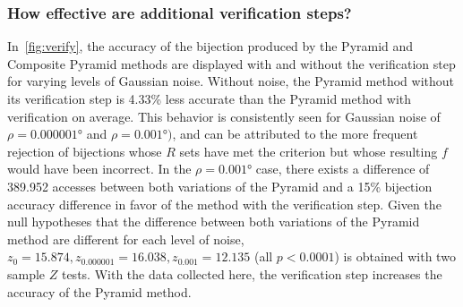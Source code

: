 \subsubsection{How effective are additional verification steps?}
%
%
%
%
%
%

In~\autoref{fig:verify}, the accuracy of the bijection produced by the Pyramid and Composite Pyramid methods are
displayed with and without the verification step for varying levels of Gaussian noise.
Without noise, the Pyramid method without its verification step is 4.33\% less accurate than the Pyramid method with
verification on average.
This behavior is consistently seen for Gaussian noise of $\rho=\ang{0.000001}$ and $\rho=\ang{0.001})$, and
can be attributed to the more frequent rejection of bijections whose $R$ sets have met the criterion but whose resulting
$f$ would have been incorrect.
In the $\rho=\ang{0.001}$ case, there exists a difference of 389.952 accesses between both variations of the Pyramid
and a 15\% bijection accuracy difference in favor of the method with the verification step.
Given the null hypotheses that the difference between both variations of the Pyramid method are different for each level
of noise, $z_0 = 15.874, z_{0.000001} = 16.038, z_{0.001} = 12.135$ (all $p < 0.0001$) is obtained with two sample
$Z$ tests.
With the data collected here, the verification step increases the accuracy of the Pyramid method.

